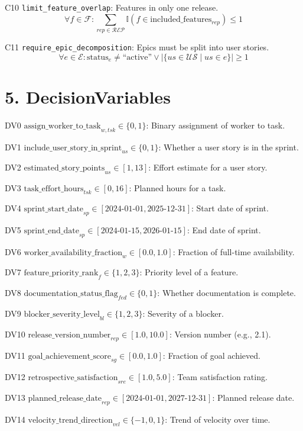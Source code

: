 \documentclass[12pt]{article}
\begin{document}
    \item[C10] \texttt{limit\_feature\_overlap}: Features in only one release.
    \[
    \forall f \in \mathcal{F}: \sum_{rep \in \mathcal{REP}} \mathbb{I}(f \in \text{included\_features}_{rep}) \leq 1
    \]

    \item[C11] \texttt{require\_epic\_decomposition}: Epics must be split into user stories.
    \[
    \forall e \in \mathcal{E}: \text{status}_e \neq \text{``active''} \lor |\{ us \in \mathcal{US} \mid us \in e \}| \geq 1
    \]

\section{5. DecisionVariables}
\item[DV0] $ \text{assign\_worker\_to\_task}_{w,tsk} \in \{0,1\} $: Binary assignment of worker to task.
    \item[DV1] $ \text{include\_user\_story\_in\_sprint}_{us} \in \{0,1\} $: Whether a user story is in the sprint.
    \item[DV2] $ \text{estimated\_story\_points}_{us} \in [1, 13] $: Effort estimate for a user story.
    \item[DV3] $ \text{task\_effort\_hours}_{tsk} \in [0, 16] $: Planned hours for a task.
    \item[DV4] $ \text{sprint\_start\_date}_{sp} \in [\text{2024-01-01}, \text{2025-12-31}] $: Start date of sprint.
    \item[DV5] $ \text{sprint\_end\_date}_{sp} \in [\text{2024-01-15}, \text{2026-01-15}] $: End date of sprint.
    \item[DV6] $ \text{worker\_availability\_fraction}_{w} \in [0.0, 1.0] $: Fraction of full-time availability.
    \item[DV7] $ \text{feature\_priority\_rank}_{f} \in \{1,2,3\} $: Priority level of a feature.
    \item[DV8] $ \text{documentation\_status\_flag}_{fed} \in \{0,1\} $: Whether documentation is complete.
    \item[DV9] $ \text{blocker\_severity\_level}_{bl} \in \{1,2,3\} $: Severity of a blocker.
    \item[DV10] $ \text{release\_version\_number}_{rep} \in [1.0, 10.0] $: Version number (e.g., 2.1).
    \item[DV11] $ \text{goal\_achievement\_score}_{sg} \in [0.0, 1.0] $: Fraction of goal achieved.
    \item[DV12] $ \text{retrospective\_satisfaction}_{sre} \in [1.0, 5.0] $: Team satisfaction rating.
    \item[DV13] $ \text{planned\_release\_date}_{rep} \in [\text{2024-01-01}, \text{2027-12-31}] $: Planned release date.
    \item[DV14] $ \text{velocity\_trend\_direction}_{vel} \in \{-1, 0, 1\} $: Trend of velocity over time.
\end{document}
